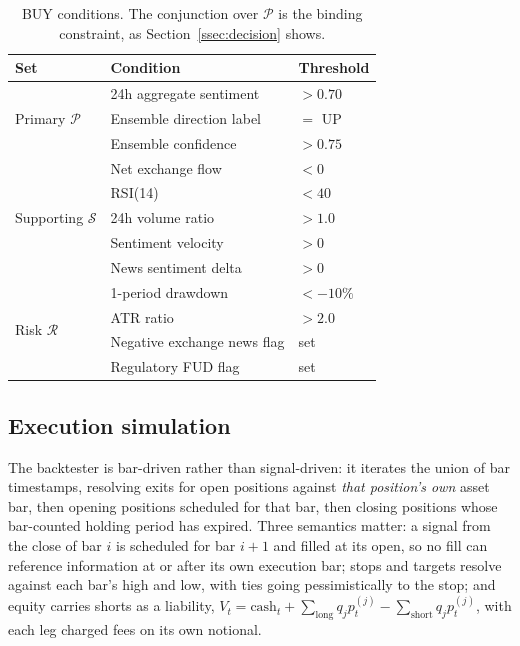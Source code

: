 \documentclass[preprint,12pt,authoryear]{elsarticle}
\begin{document}
\begin{table}[t]\centering\small
\caption{BUY conditions. The conjunction over $\mathcal{P}$ is the binding
constraint, as Section~\ref{ssec:decision} shows.}
\label{tab:signal}
\begin{tabular}{@{}lll@{}}
\toprule
Set & Condition & Threshold \\
\midrule
\multirow{3}{*}{Primary $\mathcal{P}$}
 & 24h aggregate sentiment      & $> 0.70$ \\
 & Ensemble direction label     & $=$ UP \\
 & Ensemble confidence          & $> 0.75$ \\
\midrule
\multirow{5}{*}{Supporting $\mathcal{S}$}
 & Net exchange flow            & $< 0$ \\
 & RSI(14)                      & $< 40$ \\
 & 24h volume ratio             & $> 1.0$ \\
 & Sentiment velocity           & $> 0$ \\
 & News sentiment delta         & $> 0$ \\
\midrule
\multirow{4}{*}{Risk $\mathcal{R}$}
 & 1-period drawdown            & $< -10\%$ \\
 & ATR ratio                    & $> 2.0$ \\
 & Negative exchange news flag  & set \\
 & Regulatory FUD flag          & set \\
\bottomrule
\end{tabular}
\end{table}

\subsection{Execution simulation}
\label{ssec:backtest}

The backtester is bar-driven rather than signal-driven: it iterates the union of
bar timestamps, resolving exits for open positions against \emph{that position's
own} asset bar, then opening positions scheduled for that bar, then closing
positions whose bar-counted holding period has expired. Three semantics matter:
a signal from the close of bar $i$ is scheduled for bar $i+1$ and filled at its
open, so no fill can reference information at or after its own execution bar;
stops and targets resolve against each bar's high and low, with ties going
pessimistically to the stop; and equity carries shorts as a liability,
$V_t = \text{cash}_t + \sum_{\text{long}} q_j p_t^{(j)} - \sum_{\text{short}} q_j p_t^{(j)}$,
with each leg charged fees on its own notional.
\end{document}
